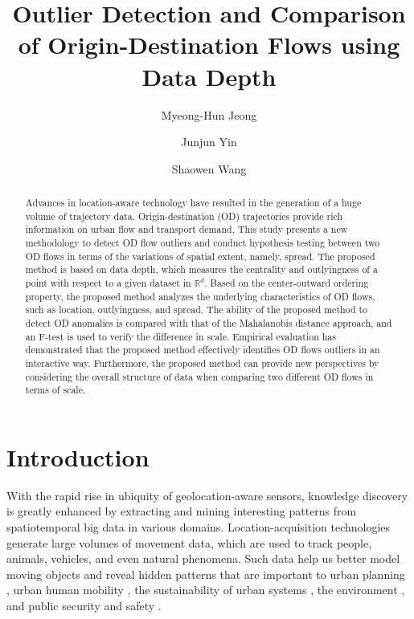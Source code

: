 \documentclass[a4paper,UKenglish]{lipics-v2018}
\title{Outlier Detection and Comparison of Origin-Destination Flows using Data Depth}
\author{Myeong-Hun Jeong}{Department of Civil Engineering, Chosun University, Gwangju, Republic of Korea}{mhjeong@chosun.ac.kr}{[orcid]}{[funding]}
\author{Junjun Yin}{Social Science Research Institute; Institute for CyberScience, Penn State University, PA, USA}{jyin@psu.edu}{[0000-0002-4196-2439]}{[This work used the Extreme Science and Engineering Discovery Environment (XSEDE), which is supported by National Science Foundation grant number ACI-1548562]}
\author{Shaowen Wang}{Department of Geography and Geographic Information Science, University of Illinois at Urbana-Champaign, IL, USA}{shaowen@illinois.edu}{[orcid]}{[funding]}
\begin{document}
\maketitle

\begin{abstract}
Advances in location-aware technology have resulted in the generation of a huge volume of trajectory data.
Origin-destination (OD) trajectories provide rich information on urban flow and transport demand.
This study presents a new methodology to detect OD flow outliers and conduct hypothesis testing between two OD flows in terms of the variations of spatial extent, namely, spread.
The proposed method is based on data depth, which measures the centrality and outlyingness of a point with respect to a given dataset in $\mathbb{R}^d$.
Based on the center-outward ordering property, the proposed method analyzes the underlying characteristics of OD flows, such as location, outlyingness, and spread.
The ability of the proposed method to detect OD anomalies is compared with that of the Mahalanobis distance approach, and an F-test is used to verify the difference in scale. Empirical evaluation has demonstrated that the proposed method effectively identifies OD flows outliers in an interactive way. Furthermore, the proposed method can provide new perspectives by considering the overall structure of data when comparing two different OD flows in terms of scale. 

 \end{abstract}

\section{Introduction}
With the rapid rise in ubiquity of geolocation-aware sensors, knowledge discovery is greatly enhanced by extracting and mining interesting patterns from spatiotemporal big data in various domains.
Location-acquisition technologies generate large volumes of movement data, which are used to track people, animals, vehicles, and even natural phenomena.
Such data help us better model moving objects and reveal hidden patterns that are important to urban planning \cite{mazimpaka15AGILE}, urban human mobility \cite{yin2017depicting,kwan1998space}, the sustainability of urban systems \cite{alberti2003integrating,chen13Percom}, the environment \cite{devarakonda13SIGKDD}, and public security and safety \cite{buchin14JOSIS}.
\end{document}
